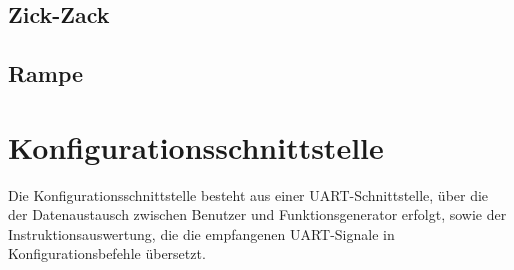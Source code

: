 \subsection{Zick-Zack}  \label{Comp:Func:ZigZag}


\subsection{Rampe} \label{Comp:Func:Ramp}

\section{Konfigurationsschnittstelle}
Die Konfigurationsschnittstelle  besteht aus einer
UART-Schnittstelle, über die der Datenaustausch zwischen Benutzer und
Funktionsgenerator erfolgt, sowie der Instruktionsauswertung, die die
empfangenen UART-Signale in Konfigurationsbefehle übersetzt.
